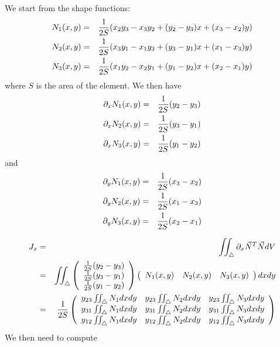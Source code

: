 We start from the shape functions:
\begin{eqnarray}
N_1(x,y) &=& \frac{1}{2S} ( x_2y_3-x_3y_2+(y_2-y_3)x+(x_3-x_2)y   ) \nonumber\\
N_2(x,y) &=& \frac{1}{2S} ( x_3y_1-x_1y_3+(y_3-y_1)x+(x_1-x_3)y   ) \nonumber\\
N_3(x,y) &=& \frac{1}{2S} ( x_1y_2-x_2y_1+(y_1-y_2)x+(x_2-x_1)y   ) \nonumber
\end{eqnarray}
where $S$ is the area of the element.
We then have 
\begin{eqnarray}
\partial_x N_1(x,y) &=& \frac{1}{2S}  (y_2-y_3) \nonumber\\
\partial_x N_2(x,y) &=& \frac{1}{2S}  (y_3-y_1) \nonumber\\
\partial_x N_3(x,y) &=& \frac{1}{2S}  (y_1-y_2) \nonumber
\end{eqnarray}
and
\begin{eqnarray}
\partial_y N_1(x,y) &=& \frac{1}{2S}  (x_3-x_2) \nonumber\\
\partial_y N_2(x,y) &=& \frac{1}{2S}  (x_1-x_3) \nonumber\\
\partial_y N_3(x,y) &=& \frac{1}{2S}  (x_2-x_1) \nonumber
\end{eqnarray}



\begin{eqnarray}
J_x
&=& \iint_\triangle  \partial_x \vec{N}^T \vec{N} dV \nonumber\\
&=&  \iint_\triangle 
\left(
\begin{array}{c}
\frac{1}{2S}(y_2-y_3) \\
\frac{1}{2S}(y_3-y_1) \\
\frac{1}{2S}(y_1-y_2)
\end{array}
\right)
\left(
\begin{array}{ccc}
N_1(x,y) & N_2(x,y) & N_3(x,y) 
\end{array}
\right) dx dy \nonumber\\
&=& \frac{1}{2S} 
\left(
\begin{array}{ccc}
y_{23} \iint_\triangle N_1 dx dy & y_{23} \iint_\triangle N_2 dx dy & y_{23} \iint_\triangle N_3 dx dy \\
y_{31} \iint_\triangle N_1 dx dy & y_{31} \iint_\triangle N_2 dx dy & y_{31} \iint_\triangle N_3 dx dy \\
y_{12} \iint_\triangle N_1 dx dy & y_{12} \iint_\triangle N_2 dx dy & y_{12} \iint_\triangle N_3 dx dy 
\end{array}
\right) 
\end{eqnarray}
We then need to compute


